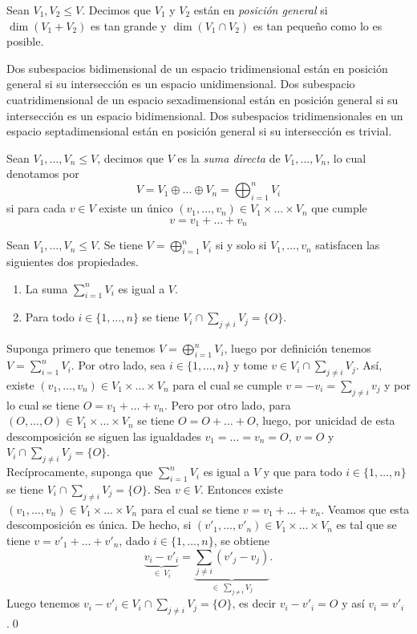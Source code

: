 \begin{defn}
Sean $V_1,V_2\le V$. Decimos que $V_1$ y $V_2$ est\'an en \emph{posici\'on general} si $\dim(V_1+V_2)$ es tan grande y $\dim(V_1\cap V_2)$ es tan peque\~no como lo es posible.
\end{defn}

\begin{ejem}
Dos subespacios bidimensional de un espacio tridimensional est\'an en posici\'on general si su intersecci\'on es un espacio unidimensional. Dos subespacio cuatridimensional de un espacio sexadimensional est\'an en posici\'on general si su intersecci\'on es un espacio bidimensional. Dos subespacios tridimensionales en un espacio septadimensional est\'an en posici\'on general si su intersecci\'on es trivial.
\end{ejem}

\begin{defn}
Sean $V_1,\ldots,V_n\le V$, decimos que $V$ es la \emph{suma directa} de $V_1,\ldots,V_n$, lo cual denotamos por
\[
V=V_1\oplus\ldots\oplus V_n=\bigoplus_{i=1}^n V_i
\]
si para cada $v\in V$ existe un \'unico $(v_1,\ldots,v_n)\in V_1\times\ldots\times V_n$ que cumple
\[
v=v_1+\ldots+v_n
\]
\end{defn}

\begin{prop}\label{sumadirsiysolosi}
Sean $V_1,\ldots,V_n\le V$. Se tiene $V=\bigoplus_{i=1}^n V_i$ si y solo si $V_1,\ldots,v_n$ satisfacen las siguientes dos propiedades.
\begin{enumerate}
\item La suma $\sum_{i=1}^n V_i$ es igual a $V$.
\item Para todo $i\in\{1,\ldots,n\}$ se tiene $V_i\cap\sum_{j\ne i} V_j=\{O\}$.
\end{enumerate}
\end{prop}

\dem Suponga primero que tenemos $V=\bigoplus_{i=1}^n V_i$, luego por definici\'on tenemos $V=\sum_{i=1}^n V_i$. Por otro lado, sea $i\in\{1,\ldots,n\}$ y tome $v\in V_i\cap\sum_{j\ne i} V_j$. As\'i, existe $(v_1,\ldots,v_n)\in V_1\times\ldots\times V_n$ para el cual se cumple $v=-v_i=\sum_{j\ne i} v_j$ y por lo cual se tiene $O=v_1+\ldots+v_n$. Pero por otro lado, para $(O,\ldots,O)\in V_1\times\ldots\times V_n$ se tiene $O=O+\ldots+O$, luego, por unicidad de esta descomposici\'on se siguen las igualdades $v_1=\ldots=v_n=O$, $v=O$ y $V_i\cap\sum_{j\ne i} V_j=\{O\}$.\\
Rec\'iprocamente, suponga que $\sum_{i=1}^n V_i$ es igual a $V$ y que para todo $i\in\{1,\ldots,n\}$ se tiene $V_i\cap\sum_{j\ne i} V_j=\{O\}$. Sea $v\in V$. Entonces existe $(v_1,\ldots,v_n)\in V_1\times\ldots\times V_n$ para el cual se tiene $v=v_1+\ldots+v_n$. Veamos que esta descomposici\'on es \'unica. De hecho, si $(v'_1,\ldots,v'_n)\in V_1\times\ldots\times V_n$ es tal que se tiene $v=v'_1+\ldots+v'_n$, dado $i\in\{1,\ldots,n\}$, se obtiene
\[
\underbrace{v_i-v'_i}_{\in\ V_i}=\underbrace{\sum_{j\ne i} (v'_j-v_j)}_{\in\ \sum_{j\ne i} V_j}.
\]
Luego tenemos $v_i-v'_i\in V_i\cap\sum_{j\ne i} V_j=\{O\}$, es decir $v_i-v'_i=O$ y as\'i $v_i=v'_i$.\qed

